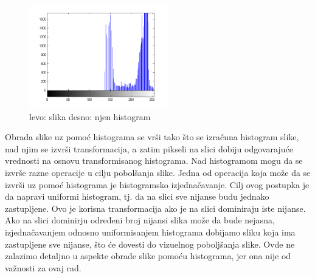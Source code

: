 \documentclass[a4paper,12pt,titlepage]{article}
\begin{document}
\begin{figure}[ht!]
\includegraphics[width=60mm]{img/histImgPow2.png}
\caption{levo: slika desno: njen histogram}
\label{overflow}
\end{figure} 

Obrada slike uz pomoć histograma se vrši tako što se izračuna histogram slike, nad njim se izvrši transformacija, a zatim pikseli na slici dobiju odgovarajuće vrednosti na osnovu transformisanog histograma. Nad histogramom mogu da se izvrše razne operacije u cilju pobolšanja slike.   
Jedna od operacija koja može da se izvrši uz pomoć histograma je histogramsko izjednačavanje. Cilj ovog postupka je da napravi uniformi histogram, tj. da na slici sve nijanse budu jednako zastupljene. Ovo je korisna transformacija ako je na slici dominiraju iste nijanse. Ako na slici dominirju određeni broj nijansi slika može da bude nejasna, izjednačavanjem odnosno uniformisanjem histograma dobijamo sliku koja ima zastupljene sve nijanse, što će dovesti do vizuelnog poboljšanja slike. Ovde ne zalazimo detaljno u aspekte obrade slike pomoću histograma, jer ona nije od važnosti za ovaj rad.
\end{document}
